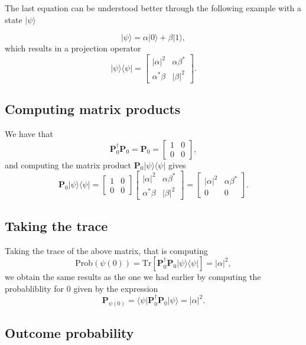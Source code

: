 The last equation can be understood better through the following example with a state $\vert \psi\rangle$

\[
\vert \psi \rangle = \alpha \vert 0\rangle+\beta \vert 1\rangle,
\]
which results in a projection operator
\[
\vert \psi \rangle\langle \psi\vert = \begin{bmatrix} \vert \alpha \vert^2 & \alpha\beta^* \\ \alpha^*\beta & \vert\beta\vert^2\end{bmatrix}.
\]

\subsection{Computing matrix products}
We have that
\[
\bm{P}_0^{\dagger}\bm{P}_0=\bm{P}_0=\begin{bmatrix} 1 & 0 \\ 0 & 0\end{bmatrix},
\]
and computing the matrix product $\bm{P}_0\vert\psi\rangle\langle \psi\vert$ gives
\[
\bm{P}_0\vert\psi\rangle\langle \psi\vert=\begin{bmatrix} 1 & 0 \\ 0 & 0\end{bmatrix}\begin{bmatrix} \vert \alpha \vert^2 & \alpha\beta^* \\ \alpha^*\beta & \vert\beta\vert^2\end{bmatrix}=\begin{bmatrix} \vert \alpha \vert^2 & \alpha\beta^* \\ 0 & 0\end{bmatrix}.
\]

\subsection{Taking the trace}

Taking the trace of the above matrix, that is computing
\[
\mathrm{Prob}(\psi(0))=\mathrm{Tr}\left[\bm{P}_0^{\dagger}\bm{P}_0\vert \psi\rangle\langle \psi\vert\right]=\vert \alpha\vert^2,
\]
we obtain the same results as the one we had earlier by computing
the probabliblity for $0$ given by the expression
\[
\bm{P}_{\psi(0)}=\langle \psi\vert \bm{P}_0^{\dagger}\bm{P}_0\vert \psi\rangle=\vert \alpha\vert^2.
\]

\subsection{Outcome probability}

